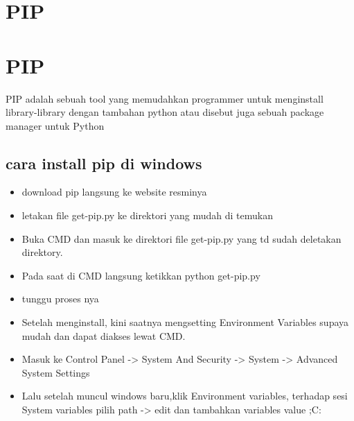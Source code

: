 
\section{PIP}

    \section{PIP}
	PIP adalah sebuah tool yang memudahkan programmer untuk menginstall library-library  dengan tambahan python atau disebut juga sebuah package manager untuk Python

	\subsection{cara install pip di windows}
		\begin{itemize}
			\item download pip langsung ke website resminya 
			\item letakan file get-pip.py ke direktori yang mudah di temukan
			\item Buka CMD  dan masuk ke direktori file get-pip.py yang td sudah deletakan direktory.
			\item Pada saat di  CMD langsung ketikkan python get-pip.py
			\item tunggu proses nya 
			\item Setelah menginstall, kini saatnya mengsetting Environment Variables supaya mudah dan dapat  diakses lewat CMD.
			\item Masuk ke Control Panel -> System And Security -> System -> Advanced System Settings
			\item Lalu setelah muncul windows baru,klik Environment variables, terhadap  sesi System variables pilih path -> edit dan tambahkan 
				  variables value ;C:\Scripts
		\end{itemize}